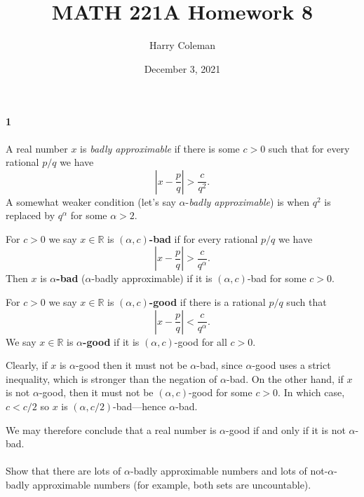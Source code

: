 \documentclass[12pt]{article}
\renewcommand{\maketitle}{\thispagestyle{title}}
\newlength{\myparskip}
\newenvironment{fullbox}{\begin{lrbox}{\savefullbox}\begin{minipage}{\dimexpr\textwidth-2\fboxsep\relax}\setlength{\parskip}{\myparskip}}{\end{minipage}\end{lrbox}\framebox[\textwidth]{\usebox{\savefullbox}}}
\newenvironment{pbox}[1][]{\begin{fullbox}\ifx#1\empty\else\paragraph{#1}\phantom{}\fi}{\end{fullbox}}
\theoremstyle{definition}
\newcommand{\R}{\mathbb{R}}
\newcommand{\<}{\langle}
\renewcommand{\>}{\rangle}
\begin{document}
\title{MATH 221A Homework 8}
\author{Harry Coleman}
\date{December 3, 2021}
\maketitle

\begin{pbox}[1]
    A real number $x$ is \emph{badly approximable} if there is some $c>0$ such that for every rational $p/q$ we have
  \[\left\lvert x-\frac{p}{q} \right\rvert>\frac{c}{q^2}.\]
  A somewhat weaker condition (let's say $\alpha$-\emph{badly approximable}) is when $q^2$ is replaced by $q^\alpha$ for some $\alpha>2$.
\end{pbox}

For $c > 0$ we say $x \in \R$ is \textbf{$(\alpha, c)$-bad} if for every rational $p/q$ we have 
\[
    \left| x - \frac{p}{q} \right| > \frac{c}{q^\alpha}.
\]
Then $x$ is \textbf{$\alpha$-bad} ($\alpha$-badly approximable) if it is $(\alpha, c)$-bad for some $c > 0$.

For $c > 0$ we say $x \in \R$ is \textbf{$(\alpha, c)$-good} if there is a rational $p/q$ such that
\[
    \left| x - \frac{p}{q} \right| < \frac{c}{q^\alpha}.
\]
We say $x \in \R$ is \textbf{$\alpha$-good} if it is $(\alpha, c)$-good for all $c > 0$.

Clearly, if $x$ is $\alpha$-good then it must not be $\alpha$-bad, since $\alpha$-good uses a strict inequality, which is stronger than the negation of $\alpha$-bad.
On the other hand, if $x$ is not $\alpha$-good, then it must not be $(\alpha, c)$-good for some $c > 0$.
In which case, $c < c/2$ so $x$ is $(\alpha, c/2)$-bad---hence $\alpha$-bad.

We may therefore conclude that a real number is $\alpha$-good if and only if it is not $\alpha$-bad.

\begin{pbox}
    Show that there are lots of $\alpha$-badly approximable numbers and lots of not-$\alpha$-badly approximable numbers (for example, both sets are uncountable).
\end{pbox}
\end{document}
